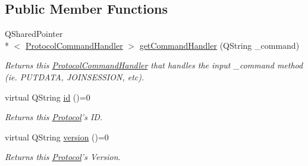 \subsection*{Public Member Functions}
\begin{DoxyCompactItemize}
\item 
\hypertarget{struct_picto_1_1_protocol_af348e89ab884a737ef69cc8cf00b08d5}{Q\-Shared\-Pointer\\*
$<$ \hyperlink{struct_picto_1_1_protocol_command_handler}{Protocol\-Command\-Handler} $>$ \hyperlink{struct_picto_1_1_protocol_af348e89ab884a737ef69cc8cf00b08d5}{get\-Command\-Handler} (Q\-String \-\_\-command)}\label{struct_picto_1_1_protocol_af348e89ab884a737ef69cc8cf00b08d5}

\begin{DoxyCompactList}\small\item\em Returns this \hyperlink{struct_picto_1_1_protocol_command_handler}{Protocol\-Command\-Handler} that handles the input \-\_\-command method (ie. P\-U\-T\-D\-A\-T\-A, J\-O\-I\-N\-S\-E\-S\-S\-I\-O\-N, etc). \end{DoxyCompactList}\item 
\hypertarget{struct_picto_1_1_protocol_a346c84ea5aa3f897b33946c6fa9121de}{virtual Q\-String \hyperlink{struct_picto_1_1_protocol_a346c84ea5aa3f897b33946c6fa9121de}{id} ()=0}\label{struct_picto_1_1_protocol_a346c84ea5aa3f897b33946c6fa9121de}

\begin{DoxyCompactList}\small\item\em Returns this \hyperlink{struct_picto_1_1_protocol}{Protocol}'s I\-D. \end{DoxyCompactList}\item 
\hypertarget{struct_picto_1_1_protocol_ac9f052a6361048803146b15fd8e0f05c}{virtual Q\-String \hyperlink{struct_picto_1_1_protocol_ac9f052a6361048803146b15fd8e0f05c}{version} ()=0}\label{struct_picto_1_1_protocol_ac9f052a6361048803146b15fd8e0f05c}

\begin{DoxyCompactList}\small\item\em Returns this \hyperlink{struct_picto_1_1_protocol}{Protocol}'s Version. \end{DoxyCompactList}\end{DoxyCompactItemize}
